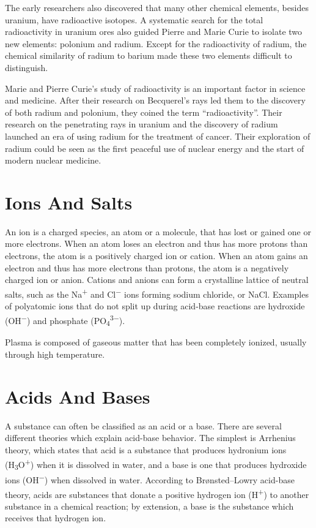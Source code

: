 The early researchers also discovered that many other chemical elements,
besides uranium, have radioactive isotopes. A systematic search for the
total radioactivity in uranium ores also guided Pierre and Marie Curie
to isolate two new elements: polonium and radium. Except for the
radioactivity of radium, the chemical similarity of radium to barium
made these two elements difficult to distinguish.

Marie and Pierre Curie's study of radioactivity is an important factor
in science and medicine. After their research on Becquerel's rays led
them to the discovery of both radium and polonium, they coined the term
``radioactivity''. Their research on the penetrating rays in uranium and
the discovery of radium launched an era of using radium for the
treatment of cancer. Their exploration of radium could be seen as the
first peaceful use of nuclear energy and the start of modern nuclear
medicine.


\hypertarget{ions-and-salts}{%
\section{Ions And Salts}\label{ions-and-salts}}

An ion is a charged species, an atom or a molecule, that has lost or gained one or more electrons. When an atom loses an electron and thus has more protons than electrons, the atom is a positively charged ion or cation. When an atom gains an electron and thus has more electrons than protons, the atom is a negatively charged ion or anion. Cations and anions can form a crystalline lattice of neutral salts, such as the Na\textsuperscript{+} and Cl\textsuperscript{−} ions forming sodium chloride, or NaCl. Examples of polyatomic ions that do not split up during acid-base reactions are hydroxide (OH\textsuperscript{−}) and phosphate (PO\textsubscript{4}\textsuperscript{3−}).

Plasma is composed of gaseous matter that has been completely ionized, usually through high temperature.

\hypertarget{acids-and-bases}{%
\section{Acids And Bases}\label{acids-and-bases}}

A substance can often be classified as an acid or a base. There are several different theories which explain acid-base behavior. The simplest is Arrhenius theory, which states that acid is a substance that produces hydronium ions (H\textsubscript{3}O\textsuperscript{+}) when it is dissolved in water, and a base is one that produces hydroxide ions (OH\textsuperscript{−}) when dissolved in water. According to Brønsted--Lowry acid-base theory, acids are substances that donate a positive hydrogen ion (H\textsuperscript{+}) to another substance in a chemical reaction; by extension, a base is the substance which receives that hydrogen ion.



